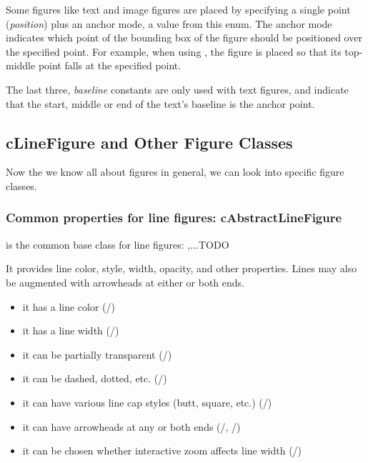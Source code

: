 Some figures like text and image figures are placed by specifying a single
point (\textit{position}) plus an anchor mode, a value from this enum. The
anchor mode indicates which point of the bounding box of the figure should
be positioned over the specified point. For example, when using
, the figure is placed so that its top-middle point falls at
the specified point.

The last three, \textit{baseline} constants are only used with text
figures, and indicate that the start, middle or end of the text's baseline
is the anchor point.


\subsection{cLineFigure and Other Figure Classes}

Now the we know all about figures in general, we can look into specific
figure classes.

\subsubsection{Common properties for line figures: cAbstractLineFigure}

 is the common base class for line figures: ,...TODO

It provides line color, style, width, opacity, and other properties. Lines may
also be augmented with arrowheads at either or both ends.

\begin{itemize}
    \item it has a line color (/)
    \item it has a line width (/)
    \item it can be partially transparent (/)
    \item it can be dashed, dotted, etc. (/)
    \item it can have various line cap styles (butt, square, etc.) (/)
    \item it can have arrowheads at any or both ends (/, /)
    \item it can be chosen whether interactive zoom affects line width (/)
\end{itemize}

